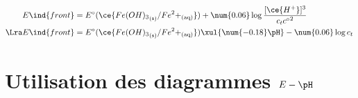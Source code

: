 \documentclass[../../main/main.tex]{subfiles}
\begin{document}
\begin{tcb*}[breakable]
\begin{enumerate}[label=\sqenumi]
\begin{itemize}
{\begin{align*}
					      E\ind{front} & =
					      E^\circ(\ce{{Fe(OH)_3}_{\rm(s)}/{Fe}^2+_{\rm(aq)}}) + \num{0.06}
					      \log \frac{[\ce{H^+}]^3}{c_t {c^\circ}^2}
					      \\\Lra
					      E\ind{front} & =
					      E^\circ(\ce{{Fe(OH)_3}_{\rm(s)}/{Fe}^2+_{\rm(aq)}})
					      \xul{\num{-0.18}\pH} - \num{0.06} \log c_t
				      \end{align*}
			      }%
			      \vspace{-15pt}
		\end{itemize}
	\end{enumerate}
	\begin{center}
	\end{center}
\end{tcb*}

\section{Utilisation des diagrammes $E-\pH$}
\label{sec:util}
\end{document}
